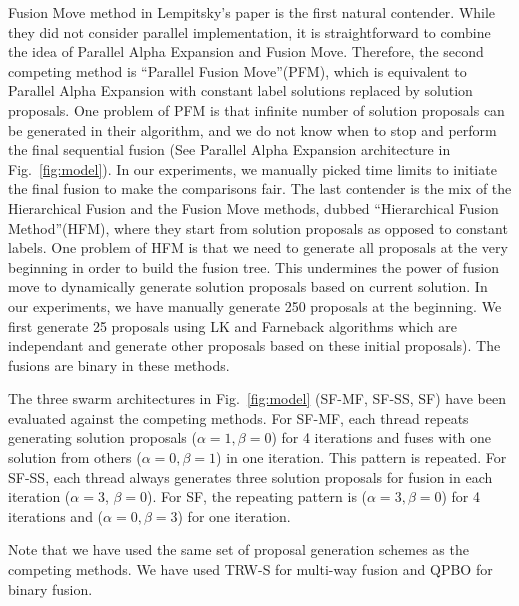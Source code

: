 \noindent Fusion Move method in Lempitsky's paper is the first natural
contender. While they did not consider parallel implementation, it is
straightforward to combine the idea of Parallel Alpha Expansion and
Fusion Move. Therefore, the second competing method is ``Parallel Fusion
Move''(PFM), which is equivalent to Parallel Alpha Expansion with constant
label solutions replaced by solution proposals.
%
One problem of PFM is that infinite number of solution proposals can be
generated in their algorithm, and we do not know when to stop and
perform the final sequential fusion (See Parallel Alpha Expansion
architecture in Fig.~\ref{fig:model}). In our experiments, we manually
picked time limits to initiate the final fusion to make the comparisons
fair.
%
The last contender is the mix of the Hierarchical Fusion and the Fusion
Move methods, dubbed ``Hierarchical Fusion Method''(HFM), where they
start from solution proposals as opposed to constant labels. One problem
of HFM is that we need to generate all proposals at the very beginning in order to build the fusion tree. This undermines the power of fusion move to dynamically generate solution proposals based on current solution. In our experiments, we have manually generate 250 proposals at the beginning. We first generate 25 proposals using LK and Farneback algorithms which are independant and generate other proposals based on these initial proposals). The fusions are binary in these methods. %


\noindent
The three swarm architectures in Fig.~\ref{fig:model} (SF-MF, SF-SS, SF)
have been evaluated against the competing methods. For SF-MF, each thread repeats generating solution proposals ($\alpha=1, \beta=0$) for 4 iterations and fuses with one solution from others ($\alpha=0, \beta=1$) in one iteration. This pattern is repeated. For SF-SS, each thread always generates three solution proposals for fusion in each iteration ($\alpha=3$, $\beta=0$). For SF, the repeating pattern is ($\alpha=3, \beta=0$) for 4 iterations and ($\alpha=0, \beta=3$) for one iteration.

%
Note that we have used the same set of proposal generation schemes as
the competing methods. We have used TRW-S for multi-way fusion and QPBO
for binary fusion.
%
%
